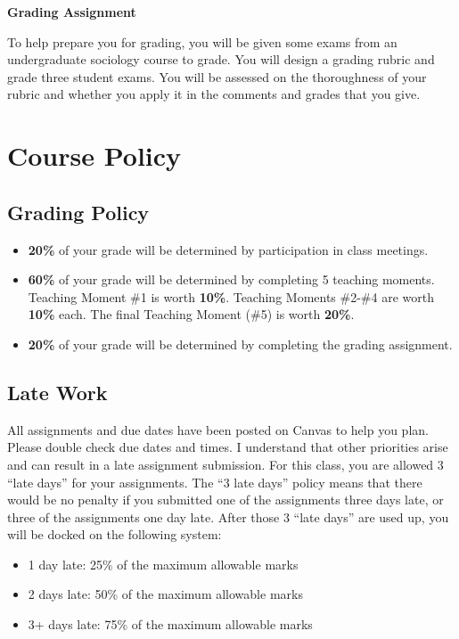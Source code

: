 \documentclass[11pt,]{article}
\providecommand{\tightlist}{%
  \setlength{\itemsep}{0pt}\setlength{\parskip}{0pt}}
\begin{document}
\textbf{Grading Assignment}

To help prepare you for grading, you will be given some exams from an
undergraduate sociology course to grade. You will design a grading
rubric and grade three student exams. You will be assessed on the
thoroughness of your rubric and whether you apply it in the comments and
grades that you give.

\hypertarget{course-policy}{%
\section{Course Policy}\label{course-policy}}

\hypertarget{grading-policy}{%
\subsection{Grading Policy}\label{grading-policy}}

\begin{itemize}
\item
  \textbf{20\%} of your grade will be determined by participation in
  class meetings.
\item
  \textbf{60\%} of your grade will be determined by completing 5
  teaching moments. Teaching Moment \#1 is worth \textbf{10\%}. Teaching
  Moments \#2-\#4 are worth \textbf{10\%} each. The final Teaching
  Moment (\#5) is worth \textbf{20\%}.
\item
  \textbf{20\%} of your grade will be determined by completing the
  grading assignment.
\end{itemize}

\hypertarget{late-work}{%
\subsection{Late Work}\label{late-work}}

All assignments and due dates have been posted on Canvas to help you
plan. Please double check due dates and times. I understand that other
priorities arise and can result in a late assignment submission. For
this class, you are allowed 3 ``late days'' for your assignments. The
``3 late days'' policy means that there would be no penalty if you
submitted one of the assignments three days late, or three of the
assignments one day late. After those 3 ``late days'' are used up, you
will be docked on the following system:

\begin{itemize}
\tightlist
\item
  1 day late: 25\% of the maximum allowable marks
\item
  2 days late: 50\% of the maximum allowable marks
\item
  3+ days late: 75\% of the maximum allowable marks
\end{itemize}
\end{document}
